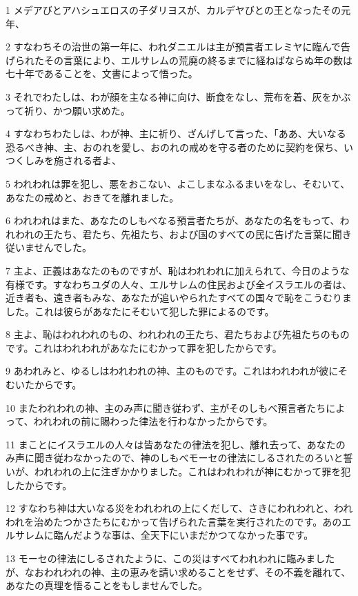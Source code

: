 \par 1 メデアびとアハシュエロスの子ダリヨスが、カルデヤびとの王となったその元年、
\par 2 すなわちその治世の第一年に、われダニエルは主が預言者エレミヤに臨んで告げられたその言葉により、エルサレムの荒廃の終るまでに経ねばならぬ年の数は七十年であることを、文書によって悟った。
\par 3 それでわたしは、わが顔を主なる神に向け、断食をなし、荒布を着、灰をかぶって祈り、かつ願い求めた。
\par 4 すなわちわたしは、わが神、主に祈り、ざんげして言った、「ああ、大いなる恐るべき神、主、おのれを愛し、おのれの戒めを守る者のために契約を保ち、いつくしみを施される者よ、
\par 5 われわれは罪を犯し、悪をおこない、よこしまなふるまいをなし、そむいて、あなたの戒めと、おきてを離れました。
\par 6 われわれはまた、あなたのしもべなる預言者たちが、あなたの名をもって、われわれの王たち、君たち、先祖たち、および国のすべての民に告げた言葉に聞き従いませんでした。
\par 7 主よ、正義はあなたのものですが、恥はわれわれに加えられて、今日のような有様です。すなわちユダの人々、エルサレムの住民および全イスラエルの者は、近き者も、遠き者もみな、あなたが追いやられたすべての国々で恥をこうむりました。これは彼らがあなたにそむいて犯した罪によるのです。
\par 8 主よ、恥はわれわれのもの、われわれの王たち、君たちおよび先祖たちのものです。これはわれわれがあなたにむかって罪を犯したからです。
\par 9 あわれみと、ゆるしはわれわれの神、主のものです。これはわれわれが彼にそむいたからです。
\par 10 またわれわれの神、主のみ声に聞き従わず、主がそのしもべ預言者たちによって、われわれの前に賜わった律法を行わなかったからです。
\par 11 まことにイスラエルの人々は皆あなたの律法を犯し、離れ去って、あなたのみ声に聞き従わなかったので、神のしもべモーセの律法にしるされたのろいと誓いが、われわれの上に注ぎかかりました。これはわれわれが神にむかって罪を犯したからです。
\par 12 すなわち神は大いなる災をわれわれの上にくだして、さきにわれわれと、われわれを治めたつかさたちにむかって告げられた言葉を実行されたのです。あのエルサレムに臨んだような事は、全天下にいまだかつてなかった事です。
\par 13 モーセの律法にしるされたように、この災はすべてわれわれに臨みましたが、なおわれわれの神、主の恵みを請い求めることをせず、その不義を離れて、あなたの真理を悟ることをもしませんでした。
